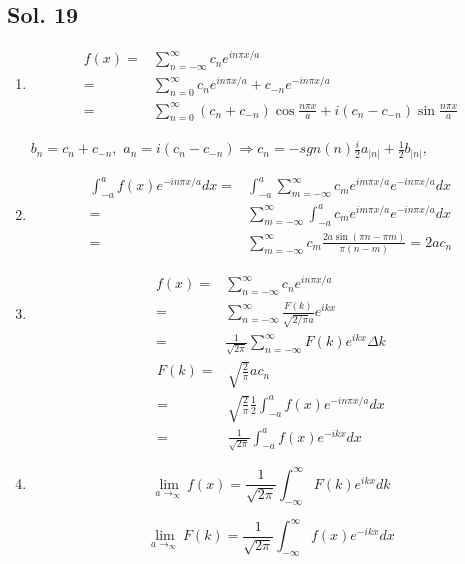 \subsection*{Sol. 19}
\begin{enumerate}
    \item 
    \begin{align*}
    f(x) =& \sum_{n=-\infty}^{\infty}c_ne^{in\pi x/a}\\
    =&\sum_{n=0}^{\infty}c_ne^{in\pi x/a} + c_{-n}e^{-in\pi x/a}\\
    =&\sum_{n=0}^{\infty}(c_n+c_{-n})\cos\frac{n\pi x}{a} + i(c_n-c_{-n})\sin\frac{n\pi x}{a}
    \end{align*}

$b_n=c_n+c_{-n},$ $a_n=i(c_n-c_{-n})\Rightarrow c_n= -sgn(n)\frac{ i}{2} a_{|n|}+ \frac{1}{2}b_{|n|},$ 

\item 
\begin{align*}
    \int_{-a}^af(x)e^{-in\pi x/a}dx = & 
    \int_{-a}^a\sum_{m=-\infty}^{\infty}c_me^{im\pi x/a}
    e^{-in\pi x/a}dx\\=&
    \sum_{m=-\infty}^{\infty}
    \int_{-a}^ac_me^{im\pi x/a}
    e^{-in\pi x/a}dx\\
    =&\sum_{m=-\infty}^{\infty}
    c_m\frac{2a \sin\left(\pi n - \pi m\right)}{\pi \left(n - m\right)}
    = 2ac_n
\end{align*}
\item 
\begin{align*}
f(x)= & \sum_{n=-\infty}^{\infty}c_ne^{in\pi x/a}\\
= & \sum_{n=-\infty}^{\infty}\frac{F(k)}{\sqrt{2/\pi}a}
e^{ikx}\\
=& \frac{1}{\sqrt{2\pi}}\sum_{n=-\infty}^{\infty}
F(k)
e^{ikx}\Delta k
\end{align*}
\begin{align*}
    F(k) = & \sqrt{\frac{2}{\pi}}ac_n\\
    = & \sqrt{\frac{2}{\pi}}\frac{1}{2}\int_{-a}^a f(x)e^{-in\pi x/a}dx\\
    =& \frac{1}{\sqrt{2\pi}}\int_{-a}^af(x)e^{-ikx}dx
\end{align*}
\item 
$$
\lim_{a\to_\infty}
f(x)=  \frac{1}{\sqrt{2\pi}}\int_{-\infty}^{\infty}
F(k)
e^{ikx}dk
$$


$$
\lim_{a\to_\infty} F(k) = 
\frac{1}{\sqrt{2\pi}}\int_{-\infty}^{\infty}f(x)e^{-ikx}dx
$$
\end{enumerate}



